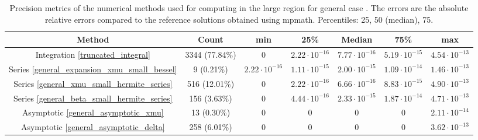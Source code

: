 \documentclass[10pt,a4paper,oneside]{article}
\numberwithin{equation}{section}
\begin{document}
\begin{table}[htbp]
\centering
\scalebox{0.9}
{
\begin{tabular}{ccccccc}
\hline
Method & Count & min & 25\% & Median & 75\% & max\\
\hline
Integration \eqref{truncated_integral} & 3344 (77.84\%) & 0 & $2.22\cdot 10^{-16}$ & $7.77\cdot 10^{-16}$ & $5.19\cdot 10^{-15}$ & $4.54\cdot 10^{-13}$\\
Series \eqref{general_expansion_xmu_small_bessel} & 9 (0.21\%) & $2.22\cdot 10^{-16}$ & $1.11\cdot 10^{-15}$ & $2.00\cdot 10^{-15}$ & $1.09\cdot 10^{-14}$ & $1.46\cdot 10^{-13}$\\
Series \eqref{general_xmu_small_hermite_series} & 516 (12.01\%) & 0 & $2.22\cdot 10^{-16}$ & $6.66\cdot 10^{-16}$ & $8.83\cdot 10^{-15}$ & $4.90\cdot 10^{-13}$\\
Series \eqref{general_beta_small_hermite_series} & 156 (3.63\%) & 0 & $4.44\cdot 10^{-16}$ & $2.33\cdot 10^{-15}$ & $1.87\cdot 10^{-14}$ & $4.71\cdot 10^{-13}$\\
Asymptotic \eqref{general_asymptotic_xmu} & 13 (0.30\%) &  0 & 0 & 0 & 0 & $2.11\cdot 10^{-14}$\\
Asymptotic \eqref{general_asymptotic_delta} & 258 (6.01\%) &  0 & 0 & 0 & 0 & $3.62\cdot 10^{-13}$\\
	\hline
\end{tabular}
}
	\caption{Precision metrics of the numerical methods used for computing in the large region for general case
	. The errors are the absolute relative errors compared to the reference solutions obtained using mpmath. Percentiles: 25, 50 (median), 75.}
	\label{table_methods_case_general_large}
\end{table}
\end{document}
